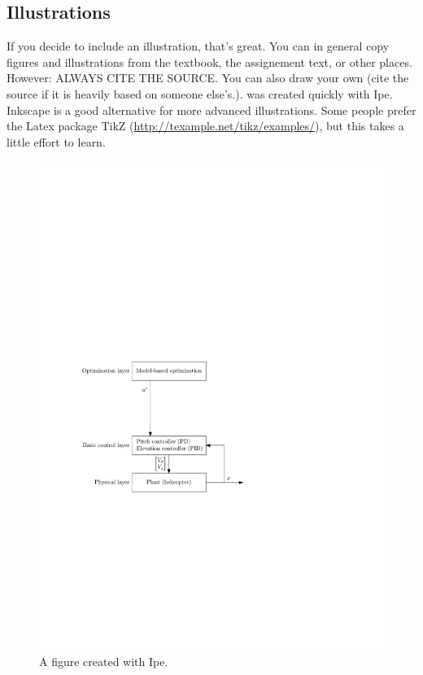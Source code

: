 \subsection{Illustrations}
If you decide to include an illustration, that's great. You can in general copy figures and illustrations from the textbook, the assignement text, or other places. However: ALWAYS CITE THE SOURCE\@. You can also draw your own (cite the source if it is heavily based on someone else's.).  was created quickly with Ipe. Inkscape is a good alternative for more advanced illustrations. Some people prefer the Latex package TikZ (\url{http://texample.net/tikz/examples/}), but this takes a little effort to learn.

\begin{figure}[tp]
	\centering
		\includegraphics[width=1.00\textwidth]{figures/layers_openloop.pdf}
	\caption{A figure created with Ipe.}
\label{fig:layers_openloop}
\end{figure}

